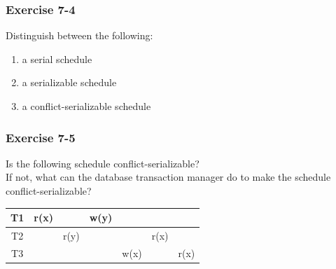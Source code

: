 \begin{frame}
\frametitle{Exercise 7-4}

Distinguish between the following:

\begin{enumerate}
  \item a serial schedule
  \item a serializable schedule
  \item a conflict-serializable schedule
\end{enumerate}

\end{frame}


\begin{frame}
\frametitle{Exercise 7-5}

Is the following schedule conflict-serializable? \\
If not, what can the database transaction manager do to make the schedule conflict-serializable?


\begin{center}
\begin{tabular}{ c c c c c c c }
  \hline
  T1 & r(x) & & w(y) & & & \\
  \hline
  T2 & & r(y) & & & r(x) & \\
  \hline
  T3 & & & & w(x) & & r(x) \\
  \hline
\end{tabular}
\end{center}

\end{frame}


